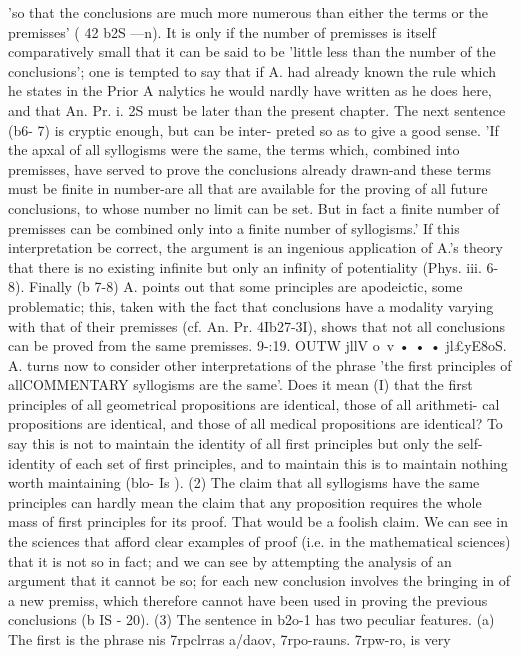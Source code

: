{{{{{{{{{{{{{{{{{{{{{{{{{{{{{{{{{{{{{{{{{'so that the conclusions are much more numerous than either
the terms or the premisses' ( 42 b2S ---n). It is only if the number of
premisses is itself comparatively small that it can be said to be
'little less than the number of the conclusions'; one is tempted
to say that if A. had already known the rule which he states in
the Prior A nalytics he would nardly have written as he does here,
and that An. Pr. i. 2S must be later than the present chapter.
The next sentence (b6- 7) is cryptic enough, but can be inter-
preted so as to give a good sense. 'If the apxal of all syllogisms
were the same, the terms which, combined into premisses, have
served to prove the conclusions already drawn-and these terms
must be finite in number-are all that are available for the
proving of all future conclusions, to whose number no limit can
be set. But in fact a finite number of premisses can be combined
only into a finite number of syllogisms.'
If this interpretation be correct, the argument is an ingenious
application of A.'s theory that there is no existing infinite but
only an infinity of potentiality (Phys. iii. 6-8).
Finally (b 7-8) A. points out that some principles are apodeictic,
some problematic; this, taken with the fact that conclusions
have a modality varying with that of their premisses (cf. An. Pr.
4Ib27-3I), shows that not all conclusions can be proved from the
same premisses.
9-:19. OUTW jllV o~v • • • jl£yE8oS. A. turns now to consider
other interpretations of the phrase 'the first principles of allCOMMENTARY
syllogisms are the same'. Does it mean (I) that the first principles
of all geometrical propositions are identical, those of all arithmeti-
cal propositions are identical, and those of all medical propositions
are identical? To say this is not to maintain the identity of all
first principles but only the self-identity of each set of first
principles, and to maintain this is to maintain nothing worth
maintaining (blo- Is ).
(2) The claim that all syllogisms have the same principles can
hardly mean the claim that any proposition requires the whole
mass of first principles for its proof. That would be a foolish
claim. We can see in the sciences that afford clear examples of
proof (i.e. in the mathematical sciences) that it is not so in fact;
and we can see by attempting the analysis of an argument that
it cannot be so; for each new conclusion involves the bringing
in of a new premiss, which therefore cannot have been used in
proving the previous conclusions (b IS - 20).
(3) The sentence in b2o-1 has two peculiar features. (a) The
first is the phrase nis 7rpclrras a/daov, 7rpo-rauns. 7rpw-ro, is very
}}}}}}}}}}}}}}}}}}}}}}}}}}}}}}}}}}}}}}}}}
